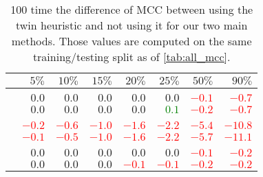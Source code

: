 \begin{table}[htpb]
  \centering
  \small
  \caption[MCC difference when using reciprocal edges]{%
    100 time the difference of MCC between using the twin heuristic and not using it for our
  two main methods. Those values are computed on the same training/testing split as of
\autoref{tab:all_mcc}.\label{tab:twin}}
  \begin{tabular}{lrrrrrrr}
    \toprule
                                & $5\%$                    & $10\%$                   & $15\%$                   & $20\%$                   & $25\%$                   & $50\%$                   & $90\%$                   \\
    \midrule
    & \multicolumn{7}{c}{\aut{}} \\ \cmidrule(lr){2-8}
    \uslpropGsecTwin{}          & $0.0$                    & $0.0$                    & $0.0$                    & $0.0$                    & $0.0$                    & \textcolor{Red}{$-0.1$}  & \textcolor{Red}{$-0.7$}  \\
    \usruleTwin{}               & $0.0$                    & $0.0$                    & $0.0$                    & $0.0$                    & \textcolor{Green}{$0.1$} & \textcolor{Red}{$-0.2$}  & \textcolor{Red}{$-0.7$}  \\
    & \multicolumn{7}{c}{\adv{}} \\ \cmidrule(lr){2-8}
    \uslpropGsecTwin{}          & \textcolor{Red}{$-0.2$}  & \textcolor{Red}{$-0.6$}  & \textcolor{Red}{$-1.0$}  & \textcolor{Red}{$-1.6$}  & \textcolor{Red}{$-2.2$}  & \textcolor{Red}{$-5.4$}  & \textcolor{Red}{$-10.8$} \\
    \usruleTwin{}               & \textcolor{Red}{$-0.1$}  & \textcolor{Red}{$-0.5$}  & \textcolor{Red}{$-1.0$}  & \textcolor{Red}{$-1.6$}  & \textcolor{Red}{$-2.2$}  & \textcolor{Red}{$-5.7$}  & \textcolor{Red}{$-11.1$} \\
    & \multicolumn{7}{c}{\wik{}} \\ \cmidrule(lr){2-8}
    \uslpropGsecTwin{}          & $0.0$                    & $0.0$                    & $0.0$                    & $0.0$                    & $0.0$                    & \textcolor{Red}{$-0.1$}  & \textcolor{Red}{$-0.2$}  \\
    \usruleTwin{}               & $0.0$                    & $0.0$                    & $0.0$                    & \textcolor{Red}{$-0.1$}  & \textcolor{Red}{$-0.1$}  & \textcolor{Red}{$-0.2$}  & \textcolor{Red}{$-0.2$}  \\

\end{tabular}
\end{table}
